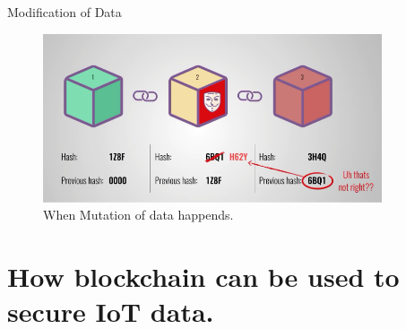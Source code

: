 \documentclass[10pt]{beamer}
\begin{document}

\begin{frame}{Modification of Data}

     \begin{figure}  
	\includegraphics[width=10cm]{block_change_hash}    
    \caption{When Mutation of data happends.} 
\end{figure}
\end{frame}


\section{How blockchain can be used to secure IoT data.}
\end{document}
